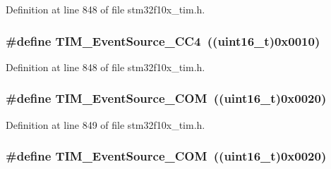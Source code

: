 Definition at line 848 of file stm32f10x\+\_\+tim.\+h.

\subsubsection[{\texorpdfstring{T\+I\+M\+\_\+\+Event\+Source\+\_\+\+C\+C4}{TIM_EventSource_CC4}}]{\setlength{\rightskip}{0pt plus 5cm}\#define T\+I\+M\+\_\+\+Event\+Source\+\_\+\+C\+C4~(({\bf uint16\+\_\+t})0x0010)}\hypertarget{group___t_i_m___event___source_gab60e3190e6c09d2d067f2c689d614979}{}\label{group___t_i_m___event___source_gab60e3190e6c09d2d067f2c689d614979}


Definition at line 848 of file stm32f10x\+\_\+tim.\+h.

\subsubsection[{\texorpdfstring{T\+I\+M\+\_\+\+Event\+Source\+\_\+\+C\+OM}{TIM_EventSource_COM}}]{\setlength{\rightskip}{0pt plus 5cm}\#define T\+I\+M\+\_\+\+Event\+Source\+\_\+\+C\+OM~(({\bf uint16\+\_\+t})0x0020)}\hypertarget{group___t_i_m___event___source_ga4c06981037fae91786f966aa9b4b3435}{}\label{group___t_i_m___event___source_ga4c06981037fae91786f966aa9b4b3435}


Definition at line 849 of file stm32f10x\+\_\+tim.\+h.

\subsubsection[{\texorpdfstring{T\+I\+M\+\_\+\+Event\+Source\+\_\+\+C\+OM}{TIM_EventSource_COM}}]{\setlength{\rightskip}{0pt plus 5cm}\#define T\+I\+M\+\_\+\+Event\+Source\+\_\+\+C\+OM~(({\bf uint16\+\_\+t})0x0020)}\hypertarget{group___t_i_m___event___source_ga4c06981037fae91786f966aa9b4b3435}{}\label{group___t_i_m___event___source_ga4c06981037fae91786f966aa9b4b3435}


